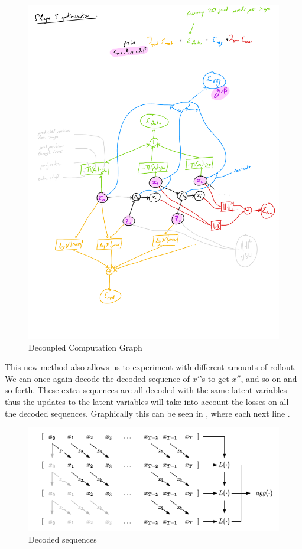 \begin{figure}[h!]
    \centering
    \includegraphics[width=1\textwidth]{Figures/humor/improvement/computation_graph_dimm.png}
    \caption{Decoupled Computation Graph}
    \label{fig:dimm_rollout_graph}
\end{figure}

This new method also allows us to experiment with different amounts of rollout. We can once again decode the decoded sequence of $x'$'s to get $x''$, and so on and so forth. These extra sequences are all decoded with the same latent variables thus the updates to the latent variables will take into account the losses on all the decoded sequences. Graphically this can be seen in , where each next line .

\begin{figure}[h!]
    \centering
    \includegraphics[width=1\textwidth]{Figures/humor/improvement/Rollout_overlap.png}
    \caption{Decoded sequences}
    \label{fig:dimm_decoded_sequences}
\end{figure}

